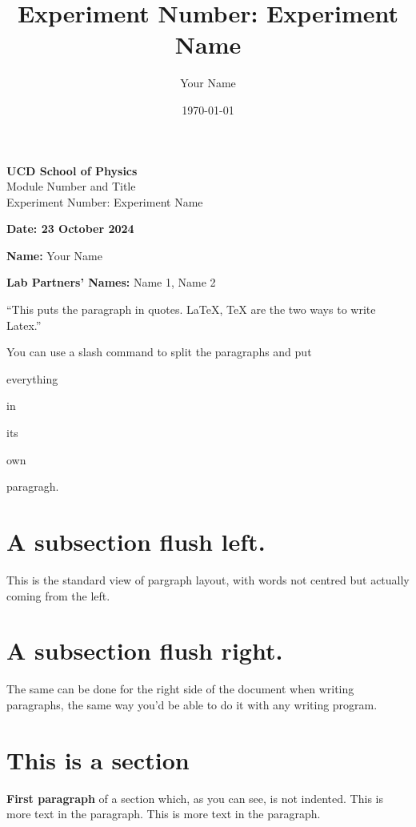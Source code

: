 \documentclass{article}
\title{Experiment Number: Experiment Name}
\author{Your Name}
\date{\today} %
\begin{document}
\begin{titlepage}
    \centering %

    {\Huge\bfseries UCD School of Physics}\\
    {\medskip}
    {\Large Module Number and Title}\\
    {\Large Experiment Number: Experiment Name}
   {\bigskip}
   
   {\Large \textbf{Date: 23 October 2024 }}
   
   {\Large \textbf{Name:} Your Name}
   
   {\Large \textbf{Lab Partners' Names:} Name 1, Name 2}
    \vspace*{2cm}

\end{titlepage}

``This puts the paragraph in quotes. 
\LaTeX{}, \TeX{} are the two ways to write Latex.''

\par You can use a slash command to split the paragraphs and put \par everything \par 
in \par its \par own \par paragragh.

\section*{A subsection flush left.}

\begin{flushleft}
This is the standard view of pargraph layout, with words not centred but actually
coming from the left.
\end{flushleft}

\section*{A subsection flush right.}

\begin{flushright}
The same can be done for the right side of the document when writing paragraphs, the
same way you'd be able to do it with any writing program.
\end{flushright}

\setlength{\parindent}{20pt}

\section*{This is a section}
\textbf{First paragraph} of a section which, as you can see, is not indented. 
This is more text in the paragraph. This is more text in the paragraph.
\end{document}

